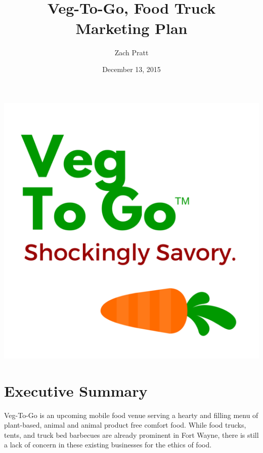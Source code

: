 \documentclass[12pt, letterpaper]{article}
\newcommand{\companyname}{Veg-To-Go}
\begin{document}
\includegraphics{VegToGoLogo}

\newpage{}

\title{\companyname{},\textsuperscript{\texttrademark} Food Truck\\ Marketing Plan}
\author{Zach Pratt}
\date{December 13, 2015}
\maketitle

\newpage

\renewcommand\contentsname{Table of Contents}
\renewcommand{\cftsecleader}{\cftdotfill{\cftdotsep}}
\tableofcontents{}

\setlength{\parindent}{.5in} %

\newpage

\section{Executive Summary}
\companyname{} is an upcoming mobile food venue serving a hearty and filling menu of plant-based, animal and animal product free comfort food.  While food trucks, tents, and truck bed barbecues are already prominent in Fort Wayne, there is still a lack of concern in these existing businesses for the ethics of food.
\end{document}
